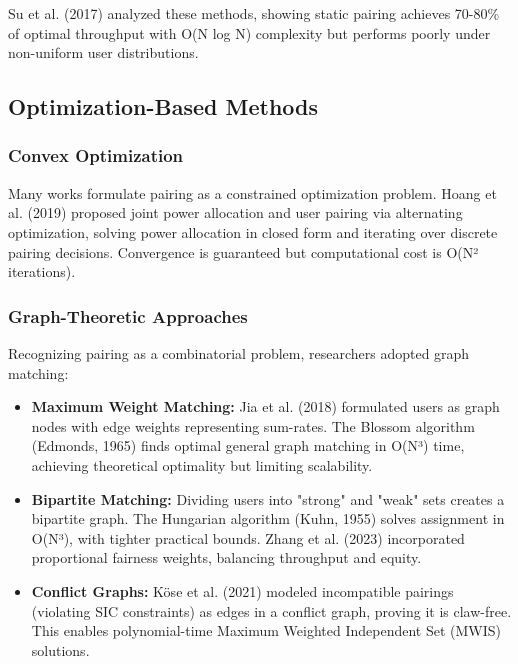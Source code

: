 Su et al. (2017) \cite{su2017} analyzed these methods, showing static pairing achieves 70-80\% of optimal throughput with O(N log N) complexity but performs poorly under non-uniform user distributions.

\subsection{Optimization-Based Methods}

\subsubsection{Convex Optimization}

Many works formulate pairing as a constrained optimization problem. Hoang et al. (2019) proposed joint power allocation and user pairing via alternating optimization, solving power allocation in closed form and iterating over discrete pairing decisions. Convergence is guaranteed but computational cost is O(N² iterations).

\subsubsection{Graph-Theoretic Approaches}

Recognizing pairing as a combinatorial problem, researchers adopted graph matching:

\begin{itemize}
    \item \textbf{Maximum Weight Matching:} Jia et al. (2018) \cite{jia2018} formulated users as graph nodes with edge weights representing sum-rates. The Blossom algorithm (Edmonds, 1965) \cite{edmonds1965} finds optimal general graph matching in O(N³) time, achieving theoretical optimality but limiting scalability.
    
    \item \textbf{Bipartite Matching:} Dividing users into "strong" and "weak" sets creates a bipartite graph. The Hungarian algorithm (Kuhn, 1955) \cite{kuhn1955} solves assignment in O(N³), with tighter practical bounds. Zhang et al. (2023) \cite{sensors2023} incorporated proportional fairness weights, balancing throughput and equity.
    
    \item \textbf{Conflict Graphs:} Köse et al. (2021) \cite{kose2021graph} modeled incompatible pairings (violating SIC constraints) as edges in a conflict graph, proving it is claw-free. This enables polynomial-time Maximum Weighted Independent Set (MWIS) solutions.
\end{itemize}

